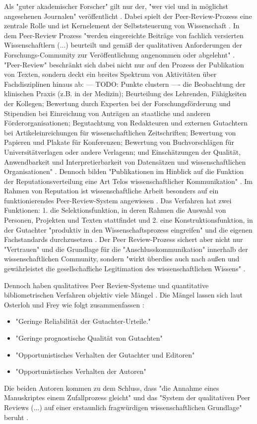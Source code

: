 Als "guter akademischer Forscher" gilt nur der, "wer viel und in möglichst angesehenen Journalen" veröffentlicht \cite{Frey_2005}. Dabei spielt der Peer-Review-Prozess eine zentrale Rolle und ist Kernelement der Selbststeuerung von Wissenschaft \cite{Neidhardt_2010}. In dem Peer-Review Prozess "werden eingereichte Beiträge von fachlich versierten Wissenschaftlern (...) beurteilt und gemäß der qualitativen Anforderungen der Forschungs-Community zur Veröffentlichung angenommen oder abgelehnt" \cite{Hess_2006}. "Peer-Review" beschränkt sich dabei nicht nur auf den Prozess der Publikation von Texten, sondern deckt ein breites Spektrum von Aktivitäten über Fachdisziplinen hinaus ab: --- TODO: Punkte clustern ---- die Beobachtung der klinischen Praxis (z.B. in der Medizin); Beurteilung des Lehrenden, Fähigkeiten der Kollegen; Bewertung durch Experten bei der Forschungsförderung und Stipendien bei Einreichung von Anträgen an staatliche und anderen Förderorganisationen; Begutachtung von Redakteuren und externen Gutachtern bei Artikeleinreichungen für wissenschaftlichen Zeitschriften; Bewertung von Papieren und Plakate für Konferenzen; Bewertung von Buchvorschlägen für Universitätverlagen oder andere Verlagenn; und Einschätzungen der Qualität, Anwendbarkeit und Interpretierbarkeit von Datensätzen und wissenschaftlichen Organisationen" \cite{Lee_2012}. Dennoch bilden "Publikationen im Hinblick auf die Funktion der Reputationsverteilung eine Art Telos wissenschaftlicher Kommunikation" \cite{hirschauer2004peer}. Im Rahmen von Reputation ist wissenschaftliche Arbeit besonders auf ein funktionierendes Peer-Review-System angewiesen \cite{suchen}. Das Verfahren hat zwei Funktionen: 1. die Selektionsfunktion, in deren Rahmen die Auswahl von Personen, Projekten und Texten stattfindet und 2. eine Konstruktionsfunktion, in der Gutachter "produktiv in den Wissenschaftsprozess eingreifen" und die eigenen Fachstandards durchzusetzen \cite{Neidhardt_2010}. Der Peer Review-Prozess sichert aber nicht nur "Vertrauen" und die Grundlage für die "Anschlusskommunikation" innerhalb der wissenschaftlichen Community, sondern "wirkt überdies auch nach außen und gewährleistet die gesellschafliche Legitimation des wissenschaftlichen Wissens" \cite{pscheida_2010_wikipedia}.

Dennoch haben qualitatives Peer Review-Systeme und quantitative bibliometrischen Verfahren objektiv viele Mängel \cite{osterloh2008anreize} \cite{Lee_2012} \cite{Jansen_2007}. Die Mängel lassen sich laut Osterloh und Frey wie folgt zusammenfassen \cite{osterloh2008anreize}:
\begin{itemize}
\item "Geringe Reliabilität der Gutachter-Urteile."
\item "Geringe prognostische Qualität von Gutachten"
\item "Opportunistisches Verhalten der Gutachter und Editoren"
\item "Opportunistisches Verhalten der Autoren"
\end{itemize}
Die beiden Autoren kommen zu dem Schluss, dass "die Annahme eines Manuskriptes einem Zufallprozess gleicht"  und das "System der qualitativen Peer Reviews (...) auf einer erstaunlich fragwürdigen wissenschaftlichen Grundlage" beruht \cite{osterloh2008anreize}.

